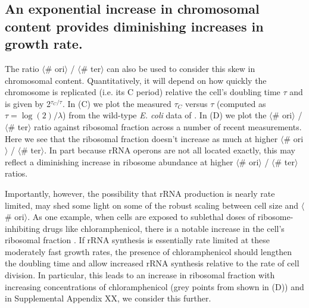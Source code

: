 \subsection{An exponential increase in chromosomal content provides diminishing
increases in growth rate.}

The ratio $\langle$\# ori$\rangle$ / $\langle$\# ter$\rangle$ can also be used
to consider this skew in chromosomal content. Quantitatively, it will depend on how
 quickly the chromosome is replicated (i.e. its C period) relative the cell's doubling time $\tau$
and is given by 2$^{\tau_C / \tau}$. In (C) we plot
the measured $\tau_C$ versus $\tau$ (computed as $\tau = \log (2) / \lambda$)
from the wild-type \textit{E. coli} data of \citep{si2017}. In (D) we
plot the $\langle$\# ori$\rangle$ / $\langle$\# ter$\rangle$ ratio against
ribosomal fraction across a number of recent measurements.
Here we see that the ribosomal fraction doesn't increase as much at higher
$\langle$\# ori$\rangle$ / $\langle$\# ter$\rangle$. In part because rRNA
operons are not all located exactly,  this may reflect a diminishing increase in
ribosome abundance at higher $\langle$\# ori$\rangle$ / $\langle$\# ter$\rangle$
ratios.

Importantly, however, the possibility that rRNA production is nearly rate
limited, may shed some light on some of the robust scaling between cell size
and $\langle$\# ori$\rangle$. As one example, when cells are exposed to
sublethal doses of ribosome-inhibiting drugs like chloramphenicol, there is a
notable increase in the cell's ribosomal fraction \citep{scott2010, dai2016}. If
rRNA synthesis is essentially rate limited at these moderately  fast growth
rates, the presence of chloramphenicol should lengthen the doubling time and
allow increased rRNA synthesis relative to the rate of cell division. In
particular, this leads to an increase in ribosomal fraction with increasing
concentrations of chloramphenicol (grey points from \cite{si2017} shown in
(D)) and in Supplemental Appendix XX, we consider
this further.


